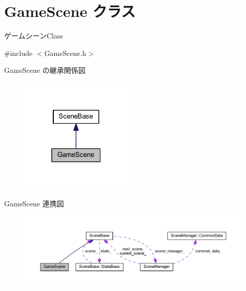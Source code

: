\hypertarget{class_game_scene}{}\section{Game\+Scene クラス}
\label{class_game_scene}


ゲームシーン\+Class  




{\ttfamily \#include $<$Game\+Scene.\+h$>$}



Game\+Scene の継承関係図
\nopagebreak
\begin{figure}[H]
\begin{center}
\leavevmode
\includegraphics[width=151pt]{class_game_scene__inherit__graph}
\end{center}
\end{figure}


Game\+Scene 連携図
\nopagebreak
\begin{figure}[H]
\begin{center}
\leavevmode
\includegraphics[width=350pt]{class_game_scene__coll__graph}
\end{center}
\end{figure}
